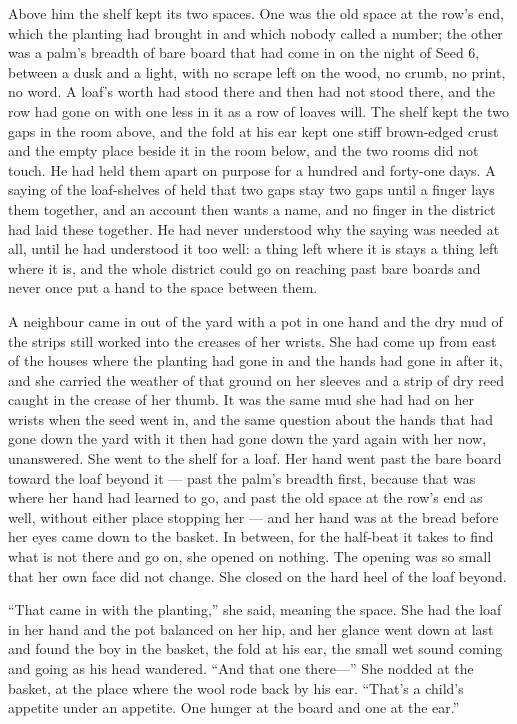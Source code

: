 Above him the shelf kept its two spaces. One was the old space at the row's end, which the planting had brought in and which nobody called a number; the other was a palm's breadth of bare board that had come in on the night of Seed 6, between a dusk and a light, with no scrape left on the wood, no crumb, no print, no word. A loaf's worth had stood there and then had not stood there, and the row had gone on with one less in it as a row of loaves will. The shelf kept the two gaps in the room above, and the fold at his ear kept one stiff brown-edged crust and the empty place beside it in the room below, and the two rooms did not touch. He had held them apart on purpose for a hundred and forty-one days. A saying of the loaf-shelves of  held that two gaps stay two gaps until a finger lays them together, and an account then wants a name, and no finger in the district had laid these together. He had never understood why the saying was needed at all, until he had understood it too well: a thing left where it is stays a thing left where it is, and the whole district could go on reaching past bare boards and never once put a hand to the space between them.

A neighbour came in out of the yard with a pot in one hand and the dry mud of the strips still worked into the creases of her wrists. She had come up from  east of the houses where the planting had gone in and the hands had gone in after it, and she carried the weather of that ground on her sleeves and a strip of dry reed caught in the crease of her thumb. It was the same mud she had had on her wrists when the seed went in, and the same question about the hands that had gone down the yard with it then had gone down the yard again with her now, unanswered. She went to the shelf for a loaf. Her hand went past the bare board toward the loaf beyond it --- past the palm's breadth first, because that was where her hand had learned to go, and past the old space at the row's end as well, without either place stopping her --- and her hand was at the bread before her eyes came down to the basket. In between, for the half-beat it takes to find what is not there and go on, she opened on nothing. The opening was so small that her own face did not change. She closed on the hard heel of the loaf beyond.

“That came in with the planting,” she said, meaning the space. She had the loaf in her hand and the pot balanced on her hip, and her glance went down at last and found the boy in the basket, the fold at his ear, the small wet sound coming and going as his head wandered. “And that one there---” She nodded at the basket, at the place where the wool rode back by his ear. “That's a child's appetite under an appetite. One hunger at the board and one at the ear.”

